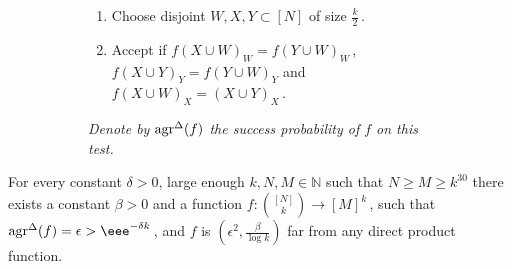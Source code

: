 \documentclass{toc}
\newcommand\f{f} %
\newcommand\setf{f} %
\newcommand{\test}[2]{
	\ifx &#2&
	\textrm{agr}^{#1}
	\else	
	\textrm{agr}^{#1}_{#2}
	\fi}
\newcommand{\sets}{\binom{[N]}{k}} %
\begin{document}
\begin{figure}[ht]
	\label{test:triangle}
	\centering
	\begin{subfigure}{0.58\textwidth}
		\begin{enumerate}
			\item Choose disjoint $W,X,Y\subset [N]$ of size $\frac{k}{2}$\,.
			\item Accept if $\setf(X\cup W)_W = \setf(Y\cup W)_W$\,, $\setf(X\cup Y)_Y= \setf(Y\cup W)_Y$ and $\setf(X\cup W)_X =(X\cup Y)_X$\,.
		\end{enumerate}
	\end{subfigure}
	\hfill
%
	\begin{subfigure}{0.4\textwidth}
		\centering
	\end{subfigure}
	\vspace{2pt}
%
	\begin{subfigure}{\textwidth}
		\vspace{5pt}
		\emph{Denote by $\test{\Delta}{}(f)$ the success probability of $\f$ on this test.}
	\end{subfigure}
\end{figure}
\begin{claim}
	For every constant $\delta >0$, large enough $k,N,M\in\mathbb{N}$ such that $N\geq M\geq k^{30}$  there exists a constant $\beta >0$ and a function $\f:\sets\rightarrow[M]^k$\,, such that $\test{\Delta}{}(f) = \epsilon > \eee^{-\delta k}$\,, and $\f$ is $(\epsilon^2, \frac{\beta}{\log k})$ far from any direct product function.
\end{claim}
\end{document}

